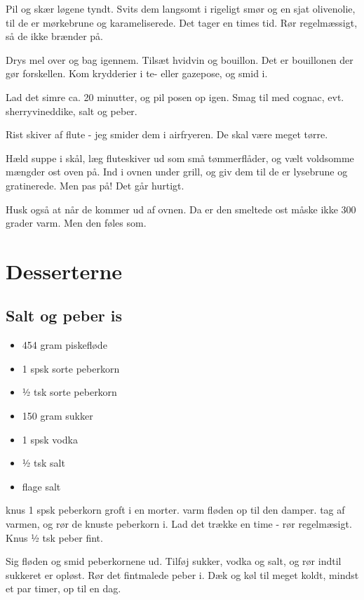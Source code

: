 \documentclass[
]{book}
\providecommand{\tightlist}{%
  \setlength{\itemsep}{0pt}\setlength{\parskip}{0pt}}
\begin{document}
Pil og skær løgene tyndt. Svits dem langsomt i rigeligt smør og
en sjat olivenolie, til de er mørkebrune og karameliserede. Det tager
en times tid. Rør regelmæssigt, så de ikke brænder på.

Drys mel over og bag igennem. Tilsæt hvidvin og bouillon. Det er bouillonen
der gør forskellen. Kom krydderier i te- eller gazepose, og smid i.

Lad det simre ca. 20 minutter, og pil posen op igen. Smag til med
cognac, evt. sherryvineddike, salt og peber.

Rist skiver af flute - jeg smider dem i airfryeren. De skal være meget
tørre.

Hæld suppe i skål, læg fluteskiver ud som små tømmerflåder, og vælt
voldsomme mængder ost oven på. Ind i ovnen under grill, og giv dem til
de er lysebrune og gratinerede. Men pas på! Det går hurtigt.

Husk også at når de kommer ud af ovnen. Da er den smeltede ost måske ikke
300 grader varm. Men den føles som.

\hypertarget{desserterne}{%
\chapter{Desserterne}\label{desserterne}}

\hypertarget{salt-og-peber-is}{%
\section{Salt og peber is}\label{salt-og-peber-is}}

\begin{itemize}
\tightlist
\item
  454 gram piskefløde
\item
  1 spsk sorte peberkorn
\item
  ½ tsk sorte peberkorn
\item
  150 gram sukker
\item
  1 spsk vodka
\item
  ½ tsk salt
\item
  flage salt
\end{itemize}

knus 1 spsk peberkorn groft i en morter.
varm fløden op til den damper. tag af varmen, og rør de
knuste peberkorn i. Lad det trække en time - rør regelmæsigt.
Knus ½ tsk peber fint.

Sig fløden og smid peberkornene ud. Tilføj sukker,
vodka og salt, og rør indtil sukkeret er opløst.
Rør det fintmalede peber i. Dæk og køl til meget
koldt, mindst et par timer, op til en dag.
\end{document}
